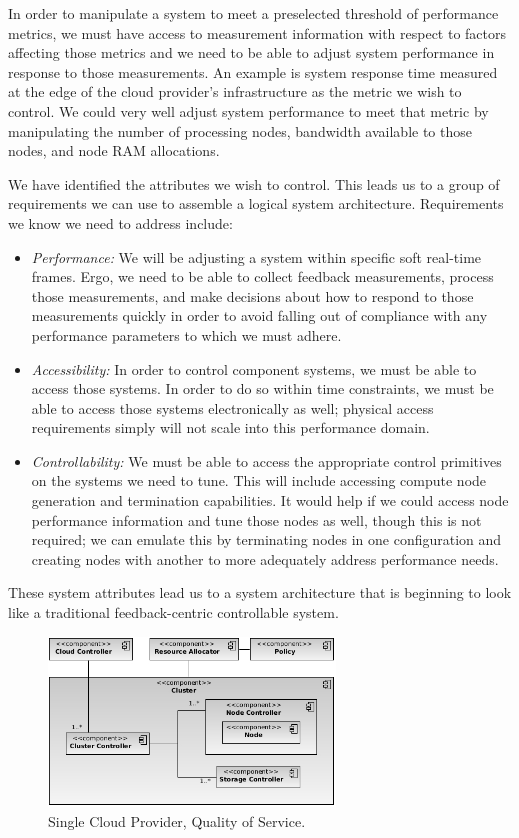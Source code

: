 \documentclass[10pt,letterpaper]{book}
\begin{document}
In order to manipulate a system to meet a preselected threshold of performance metrics, we must have access to measurement information with respect to factors affecting those metrics and we need to be able to adjust system performance in response to those measurements.  An example is system response time measured at the edge of the cloud provider's infrastructure as the metric we wish to control.  We could very well adjust system performance to meet that metric by manipulating the number of processing nodes, bandwidth available to those nodes, and node RAM allocations.

We have identified the attributes we wish to control.  This leads us to a group of requirements we can use to assemble a logical system architecture.  Requirements we know we need to address include:

\begin{itemize}
\item \textit{Performance:} We will be adjusting a system within specific soft real-time frames.  Ergo, we need to be able to collect feedback measurements, process those measurements, and make decisions about how to respond to those measurements quickly in order to avoid falling out of compliance with any performance parameters to which we must adhere.
\item \textit{Accessibility:} In order to control component systems, we must be able to access those systems.  In order to do so within time constraints, we must be able to access those systems electronically as well; physical access requirements simply will not scale into this performance domain.
\item \textit{Controllability:} We must be able to access the appropriate control primitives on the systems we need to tune.  This will include accessing compute node generation and termination capabilities.  It would help if we could access node performance information and tune those nodes as well, though this is not required; we can emulate this by terminating nodes in one configuration and creating nodes with another to more adequately address performance needs.
\end{itemize}

These system attributes lead us to a system architecture that is beginning to look like a traditional feedback-centric controllable system.

\begin{figure}[!t]
\centering
\includegraphics[width=3in]{Single-QoS}
\caption{Single Cloud Provider, Quality of Service.}
\label{fig:single-qos}
\end{figure}
\end{document}
